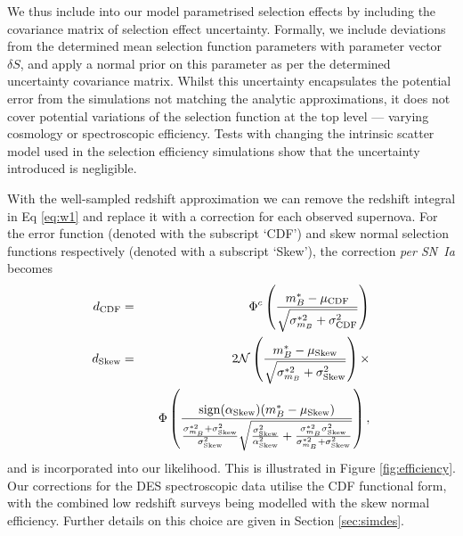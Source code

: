 \documentclass[twocolumn,trackchanges,tighten]{aastex62}
\begin{document}
We thus include into our model parametrised selection effects by including the covariance matrix of selection effect uncertainty. Formally, we include deviations from the determined mean selection function parameters with parameter vector $\delta S$, and apply a normal prior on this parameter as per the determined uncertainty covariance matrix.  Whilst this uncertainty encapsulates the potential error from the simulations not matching the analytic approximations, it does not cover potential variations of the selection function at the top level --- varying cosmology or spectroscopic efficiency. Tests with changing the intrinsic scatter model used in the selection efficiency simulations show that the uncertainty introduced is negligible.


With the well-sampled redshift approximation we can remove the redshift integral in Eq \eqref{eq:w1} and replace it with a correction for each observed supernova. For the error function (denoted with the subscript `CDF') and skew normal selection functions respectively (denoted with a subscript `Skew'), the correction \textit{per SN~Ia} becomes
\begin{eqnarray}
d_{\rm CDF} &=& \Phi^c\left(  \frac{m^*_B - \mu_{\rm CDF}}{\sqrt{\sigma^{*2}_{m_B} + \sigma_{\rm CDF}^2}}  \right) \label{eq:seldes}\\
d_{\rm Skew} &=& 2\mathcal{N}\left( \frac{m_B^* - \mu_{\rm Skew}}{\sqrt{\sigma^{*2}_{m_B} + \sigma_{\rm Skew}^2}}\right) \times \notag\\
&\quad\quad& \Phi\left(  \frac{{\rm sign}(\alpha_{\rm Skew})(m_B^* - \mu_{\rm Skew})}{\frac{\sigma_{m_B}^{*2} + \sigma^2_{\rm Skew}}{\sigma^2_{\rm Skew}} \sqrt{\frac{\sigma^2_{\rm Skew}}{\alpha^2_{\rm Skew}} + \frac{\sigma_{m_B}^{*2} \sigma^2_{\rm Skew}}{\sigma_{m_B}^{*2} + \sigma^2_{\rm Skew}}} }\right), \label{eq:sellow-z}
\end{eqnarray}
and is incorporated into our likelihood.  This is illustrated in Figure \ref{fig:efficiency}. Our corrections for the DES spectroscopic data utilise the CDF functional form, with the combined low redshift surveys being modelled with the skew normal efficiency. Further details on this choice are given in Section \ref{sec:simdes}.
\end{document}
